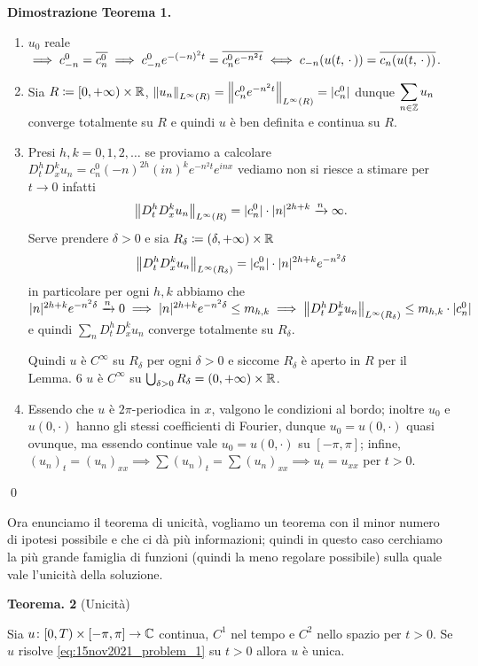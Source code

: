 \textbf{Dimostrazione Teorema 1.}
\begin{enumerate}
	\item $u_0$ reale $\implies c_{-n}^0 = \overline{c_n^0} \implies c_{-n}^0 e^{-(-n)^2 t} = \overline{c_n^0 e^{-n^2 t}} \iff c_{-n}(u(t, \,\cdot\,)) = \overline{c_{n}(u(t, \,\cdot\,))}$.

	\item Sia $R \coloneqq [0, +\infty) \times \mathbb R$, $\left\lVert u_n \right\rVert_{L^\infty(R)} = \left\lVert c_n^0 e^{-n^2 t} \right\rVert_{L^\infty (R)} =  |c_n^0|$ dunque
		$\displaystyle\sum_{n \in \mathbb Z} u_n$ converge totalmente su $R$ e quindi $u$ è ben definita e continua su $R$.

	\item Presi $h, k = 0, 1, 2, \dots$ se proviamo a calcolare $D_t^h D_x^k u_n = c_n^0 (-n)^{2h} (in)^k e^{-n^2 t} e^{inx}$ vediamo non si riesce a stimare per $t \to 0$ infatti
		$$
		\left\lVert D_t^h D_x^k u_n \right\rVert_{L^\infty(R)}
		= |c_n^0| \cdot |n|^{2h + k} \xrightarrow{n} \infty.
		$$
		Serve prendere $\delta > 0$ e sia $R_\delta \coloneqq (\delta, +\infty) \times \mathbb R$
		$$
		\left\lVert D_t^h D_x^k u_n \right\rVert_{L^\infty(R_\delta)}
		= |c_n^0| \cdot |n|^{2h + k} e^{-n^2 \delta}
		$$
		in particolare per ogni $h, k$ abbiamo che $|n|^{2h + k} e^{-n^2 \delta} \xrightarrow{n} 0 \implies |n|^{2h + k} e^{-n^2 \delta} \leq m_{h,k} \implies \left\lVert D_t^h D_x^k u_n \right\rVert_{L^\infty(R_\delta)} \leq m_{h,k} \cdot |c_n^0|$ e quindi $\sum_n D_t^h D_x^k u_n$ converge totalmente su $R_\delta$.

		Quindi $u$ è $C^\infty$ su $R_\delta$ per ogni $\delta > 0$ e siccome $R_\delta$ è aperto in $R$ per il Lemma. 6 $u$ è $C^\infty$ su $\bigcup_{\delta > 0} R_\delta = (0, +\infty) \times \mathbb R$.

	\item Essendo che $u$ è $2\pi$-periodica in $x$, valgono le condizioni al bordo; inoltre $u_0$ e $u(0,\cdot)$ hanno gli stessi coefficienti di Fourier, dunque $u_0 = u(0,\cdot)$ quasi ovunque, ma essendo continue vale $u_0 = u(0,\cdot)$ su $[-\pi,\pi]$; infine, $(u_n)_t = (u_n)_{xx} \implies \sum (u_n)_t = \sum (u_n)_{xx} \implies u_t = u_{xx}$ per $t > 0$.
\end{enumerate}
\qed

Ora enunciamo il teorema di unicità, vogliamo un teorema con il minor numero di ipotesi possibile e che ci dà più informazioni; quindi in questo caso cerchiamo la più grande famiglia di funzioni (quindi la meno regolare possibile) sulla quale vale l'unicità della soluzione.

\hypertarget{thm:lez15nov_teo2}{%
\textbf{Teorema. 2} (Unicità)}
Sia $u \colon [0, T) \times [-\pi, \pi] \to \mathbb C$ continua, $C^1$ nel tempo e $C^2$ nello spazio per $t > 0$. Se $u$ risolve \eqref{eq:15nov2021_problem_1} su $t > 0$ allora $u$ è unica.

